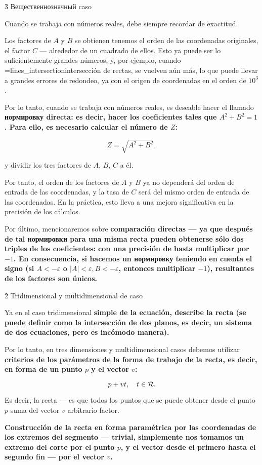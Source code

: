 \h3{ Вещественнозначный caso }

Cuando se trabaja con números reales, debe siempre recordar de exactitud.

Los factores de $A$ y $B$ se obtienen tenemos el orden de las coordenadas originales, el factor $C$ --- alrededor de un cuadrado de ellos. Esto ya puede ser lo suficientemente grandes números, y, por ejemplo, cuando \algohref=lines_intersection{intersección de rectas}, se vuelven aún más, lo que puede llevar a grandes errores de redondeo, ya con el origen de coordenadas en el orden de $10^3$.

Por lo tanto, cuando se trabaja con números reales, es deseable hacer el llamado \bf{нормировку} directa: es decir, hacer los coeficientes tales que $A^2 + B^2 = 1$. Para ello, es necesario calcular el número de $Z$:

$$ Z = \sqrt{ A^2 + B^2 }, $$

y dividir los tres factores de $A$, $B$, $C$ a él.

Por tanto, el orden de los factores de $A$ y $B$ ya no dependerá del orden de entrada de las coordenadas, y la tasa de $C$ será del mismo orden de entrada de las coordenadas. En la práctica, esto lleva a una mejora significativa en la precisión de los cálculos.

Por último, mencionaremos sobre \bf{comparación} directas --- ya que después de tal нормировки para una misma recta pueden obtenerse sólo dos triples de los coeficientes: con una precisión de hasta multiplicar por $-1$. En consecuencia, si hacemos un нормировку teniendo en cuenta el signo (si $A<-\varepsilon$ o $|A|<\varepsilon, B<-\varepsilon$, entonces multiplicar $-1$), resultantes de los factores son únicos.


\h2{ Tridimensional y multidimensional de caso }

Ya en el caso tridimensional \bf{simple de la ecuación}, describe la recta (se puede definir como la intersección de dos planos, es decir, un sistema de dos ecuaciones, pero es incómodo manera).

Por lo tanto, en tres dimensiones y multidimensional casos debemos utilizar \bf{criterios de los parámetros de la forma de trabajo de la recta}, es decir, en forma de un punto $p$ y el vector $v$:

$$ p + v t, ~~~ t \in \cal{R}. $$

Es decir, la recta --- es que todos los puntos que se puede obtener desde el punto $p$ suma del vector $v$ arbitrario factor.

\bf{Construcción} de la recta en forma paramétrica por las coordenadas de los extremos del segmento --- trivial, simplemente nos tomamos un extremo del corte por el punto $p$, y el vector desde el primero hasta el segundo fin --- por el vector $v$.